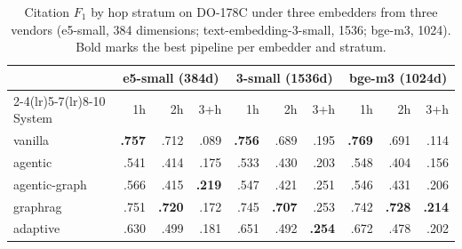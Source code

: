 \begin{table}[t]
  \centering
  \caption{Citation $F_1$ by hop stratum on DO-178C under three embedders from three vendors (e5-small, 384 dimensions; text-embedding-3-small, 1536; bge-m3, 1024). Bold marks the best pipeline per embedder and stratum.}
  \label{tab:embedders}
  \small
  \setlength{\tabcolsep}{4pt}
    \begin{tabular}{l rrr rrr rrr}
    \toprule
    & \multicolumn{3}{c}{e5-small (384d)} & \multicolumn{3}{c}{3-small (1536d)} & \multicolumn{3}{c}{bge-m3 (1024d)} \\
    \cmidrule(lr){2-4}\cmidrule(lr){5-7}\cmidrule(lr){8-10}
    System & 1h & 2h & 3+h & 1h & 2h & 3+h & 1h & 2h & 3+h \\
    \midrule
    vanilla       & \textbf{.757} & .712 & .089 & \textbf{.756} & .689 & .195 & \textbf{.769} & .691 & .114 \\
    agentic       & .541 & .414 & .175 & .533 & .430 & .203 & .548 & .404 & .156 \\
    agentic-graph & .566 & .415 & \textbf{.219} & .547 & .421 & .251 & .546 & .431 & .206 \\
    graphrag      & .751 & \textbf{.720} & .172 & .745 & \textbf{.707} & .253 & .742 & \textbf{.728} & \textbf{.214} \\
    adaptive      & .630 & .499 & .181 & .651 & .492 & \textbf{.254} & .672 & .478 & .202 \\
    \bottomrule
  \end{tabular}
\end{table}
